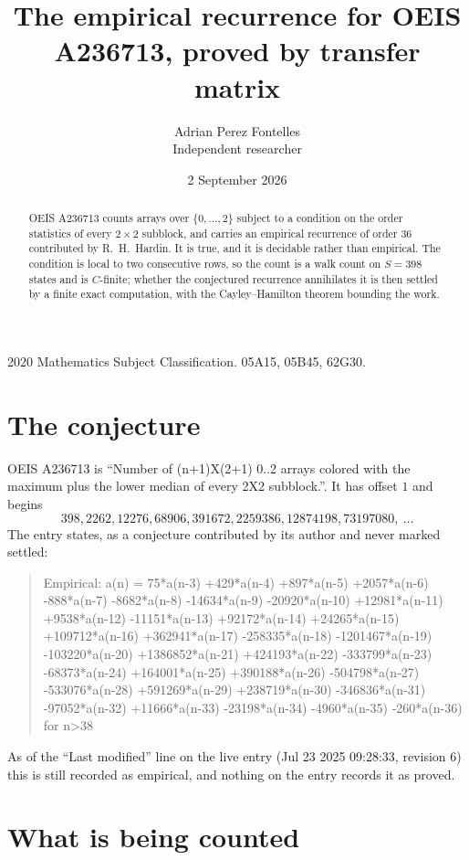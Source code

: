 \documentclass[11pt,a4paper]{article}
\title{The empirical recurrence for OEIS A236713, proved by transfer matrix}
\author{Adrian Perez Fontelles\\ \small Independent researcher}
\date{2 September 2026}
\theoremstyle{plain}
\theoremstyle{definition}
\begin{document}
\maketitle

\begin{abstract}
OEIS A236713 counts arrays over $\{0,\dots,2\}$ subject to a condition on the order
statistics of every $2\times2$ subblock, and carries an empirical recurrence of order
$36$ contributed by R.~H.~Hardin. It is true, and it is decidable rather than empirical.
The condition is local to two consecutive rows, so the count is a walk count on $S=398$
states and is $C$-finite; whether the conjectured recurrence annihilates it is then settled by
a finite exact computation, with the Cayley--Hamilton theorem bounding the work.
\end{abstract}

\noindent\small 2020 Mathematics Subject Classification. 05A15, 05B45, 62G30.\normalsize

\section{The conjecture}

OEIS A236713 is ``Number of (n+1)X(2+1) 0..2 arrays colored with the maximum plus the lower median of every 2X2 subblock.''. It has offset $1$ and begins
\[
398, 2262, 12276, 68906, 391672, 2259386, 12874198, 73197080,\ \dots
\]
The entry states, as a conjecture contributed by its author and never marked settled:
\begin{quote}
Empirical: a(n) = 75*a(n-3) +429*a(n-4) +897*a(n-5) +2057*a(n-6) -888*a(n-7) -8682*a(n-8) -14634*a(n-9) -20920*a(n-10) +12981*a(n-11) +9538*a(n-12) -11151*a(n-13) +92172*a(n-14) +24265*a(n-15) +109712*a(n-16) +362941*a(n-17) -258335*a(n-18) -1201467*a(n-19) -103220*a(n-20) +1386852*a(n-21) +424193*a(n-22) -333799*a(n-23) -68373*a(n-24) +164001*a(n-25) +390188*a(n-26) -504798*a(n-27) -533076*a(n-28) +591269*a(n-29) +238719*a(n-30) -346836*a(n-31) -97052*a(n-32) +11666*a(n-33) -23198*a(n-34) -4960*a(n-35) -260*a(n-36) for n>38
\end{quote}
As of the ``Last modified'' line on the live entry (Jul 23 2025 09:28:33, revision 6) this is still
recorded as empirical, and nothing on the entry records it as proved.

\section{What is being counted}
\end{document}
